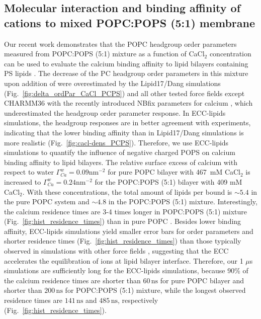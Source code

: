 \documentclass[journal=jctcce,manuscript=article]{achemso}
\begin{document}
\subsection{Molecular interaction and binding affinity of  cations to mixed POPC:POPS (5:1) membrane} 
\label{section:lip-ion_ca}
Our recent work demonstrates that the POPC headgroup order parameters measured
from POPC:POPS (5:1) mixture as a function of CaCl$_2$ concentration 
can be used to evaluate the calcium binding affinity to lipid bilayers containing PS lipids \cite{roux90,NMRlipidsIV}.
The decrease of the PC headgroup order parameters in this mixture upon addition of  
were overestimated by the Lipid17/Dang simulations (Fig.~\ref{fig:delta_ordPar_CaCl_PCPS})
and all other tested force fields except CHARMM36 with the recently introduced NBfix parameters for calcium \cite{kim16,han2018graph},
which underestimated the headgroup order parameter response.
In ECC-lipids simulations, the headgroup responses are in better agreement with experiments,
indicating that the lower binding affinity than in Lipid17/Dang simulations is more realistic (Fig.~\ref{fig:cacl-dens_PCPS}).
Therefore, we use ECC-lipids simulations to quantify the influence of negative charged POPS on
calcium binding affinity to lipid bilayers.
The relative surface excess of calcium with respect to water 
$\Gamma^{w}_{Ca} = 0.09\mathrm{nm^{-2}}$
for pure POPC bilayer with 467~mM CaCl$_2$ \cite{ECC-POPC_nacl_cacl2_files}
is increased to
$\Gamma^{w}_{Ca} = 0.24\mathrm{nm^{-2}}$
for the POPC:POPS (5:1) bilayer with 409 mM CaCl$_2$.
With these concentrations, the total amount of lipids per bound  is
$\sim 5.4$ in the pure POPC system and $\sim 4.8$ in the POPC:POPS (5:1) mixture.
Interestingly, the calcium residence times are 3-4 times longer in POPC:POPS (5:1) mixture (Fig.~\ref{fig:hist_residence_times}) than in pure POPC \cite{melcr18}.
Besides lower binding affinity, ECC-lipids simulations yield smaller error bars for order parameters and shorter residence times (Fig.~\ref{fig:hist_residence_times}) 
than those typically observed in simulations with other force fields \cite{javanainen17,melcr18,NMRlipidsIV},
suggesting that the ECC accelerates the equilibration of ions at lipid bilayer interface.
Therefore, our 1 $\mu$s simulations are sufficiently long for the ECC-lipids simulations, because
90\% of the calcium residence times are shorter than $60\,\mathrm{ns}$ for pure POPC bilayer
and shorter than $200\,\mathrm{ns}$ for POPC:POPS (5:1) mixture, while the
longest observed residence times are $141\,\mathrm{ns}$ and $485\,\mathrm{ns}$, respectively (Fig.~\ref{fig:hist_residence_times}).
\end{document}
